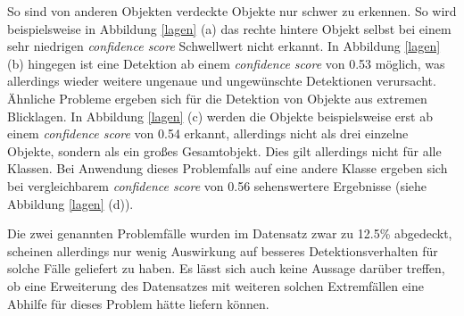 So sind von anderen Objekten verdeckte Objekte nur schwer zu erkennen. So wird beispielsweise in Abbildung \ref{lagen} (a) das rechte hintere Objekt selbst bei einem sehr niedrigen \textit{confidence score} Schwellwert nicht erkannt. In Abbildung \ref{lagen} (b) hingegen ist eine Detektion ab einem \textit{confidence score} von 0.53 möglich, was allerdings wieder weitere ungenaue und ungewünschte Detektionen verursacht. Ähnliche Probleme ergeben sich für die Detektion von Objekte aus extremen Blicklagen. In Abbildung \ref{lagen} (c) werden die Objekte beispielsweise erst ab einem \textit{confidence score} von 0.54 erkannt, allerdings nicht als drei einzelne Objekte, sondern als ein großes Gesamtobjekt. Dies gilt allerdings nicht für alle Klassen. Bei Anwendung dieses Problemfalls auf eine andere Klasse ergeben sich bei vergleichbarem \textit{confidence score} von 0.56 sehenswertere Ergebnisse (siehe Abbildung \ref{lagen} (d)). 

Die zwei genannten Problemfälle wurden im Datensatz zwar zu 12.5\% abgedeckt, scheinen allerdings nur wenig Auswirkung auf besseres Detektionsverhalten für solche Fälle geliefert zu haben. Es lässt sich auch keine Aussage darüber treffen, ob eine Erweiterung des Datensatzes mit weiteren solchen Extremfällen eine Abhilfe für dieses Problem hätte liefern können. 

